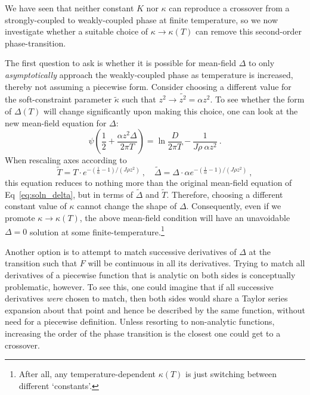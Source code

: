\documentclass[12pt]{article}
\begin{document}
We have seen that neither constant $ K $ nor $ \kappa $ can reproduce a crossover from a strongly-coupled to weakly-coupled phase at finite temperature, so we now investigate whether a suitable choice of $ \kappa \rightarrow \kappa(T) $ can remove this second-order phase-transition.

The first question to ask is whether it is possible for mean-field $ \Delta $ to only \emph{asymptotically} approach the weakly-coupled phase as temperature is increased, thereby not assuming a piecewise form. Consider choosing a different value for the soft-constraint parameter $ \widetilde{\kappa} $ such that $ z^2 \rightarrow \widetilde{z^2} = \alpha z^2 $. To see whether the form of $ \Delta(T) $ will change significantly upon making this choice, one can look at the new mean-field equation for $ \Delta $:
\begin{equation}
\psi \left( \frac{1}{2} + \frac{\alpha z^2 \Delta}{2 \pi T} \right) = \ln{\frac{D}{2 \pi T}} - \frac{1}{J \rho ~ \alpha z^2} ~ .
\end{equation}
When rescaling axes according to
\begin{equation}
\widetilde{T} = T \cdot e^{- \left( \frac{1}{\alpha} - 1 \right) / (J \rho z^2)} ~, \quad \widetilde{\Delta} = \Delta \cdot \alpha e^{- \left( \frac{1}{\alpha} - 1 \right) / (J \rho z^2)} ~ ,
\end{equation}
this equation reduces to nothing more than the original mean-field equation of Eq~\eqref{eq:soln_delta}, but in terms of $ \widetilde{\Delta} $ and $ \widetilde{T} $.
Therefore, choosing a different constant value of $ \kappa $ cannot change the shape of $ \Delta $. Consequently, even if we promote $ \kappa \rightarrow \kappa(T) $, the above mean-field condition will have an unavoidable $ \Delta = 0 $ solution at some finite-temperature.\footnote{After all, any temperature-dependent $ \kappa(T) $ is just switching between different `constants'.}

Another option is to attempt to match successive derivatives of $ \Delta $ at the transition such that $ F $ will be continuous in all its derivatives. Trying to match all derivatives of a piecewise function that is analytic on both sides is conceptually problematic, however. To see this, one could imagine that if all successive derivatives \textit{were} chosen to match, then both sides would share a Taylor series expansion about that point and hence be described by the same function, without need for a piecewise definition. Unless resorting to non-analytic functions, increasing the order of the phase transition is the closest one could get to a crossover.
\end{document}
